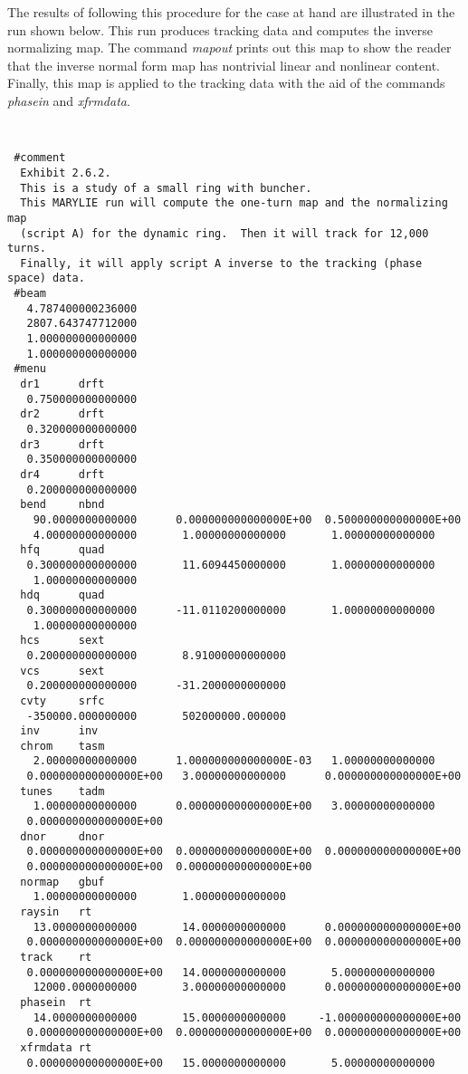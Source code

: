      The results of following this procedure for the case at hand are illustrated
in the \Mary run shown below.  This run produces tracking data and computes the inverse normalizing map.  The command {\em mapout} prints out this map
to show the reader that the inverse normal form map has nontrivial linear
and nonlinear content.  Finally, this map is applied to the tracking data with the aid of the commands {\em phasein} and {\em xfrmdata}.

{
\footnotesize\tt
\begin{verbatim}
 #comment
  Exhibit 2.6.2.
  This is a study of a small ring with buncher.
  This MARYLIE run will compute the one-turn map and the normalizing map
  (script A) for the dynamic ring.  Then it will track for 12,000 turns.
  Finally, it will apply script A inverse to the tracking (phase space) data.
 #beam
   4.787400000236000
   2807.643747712000
   1.000000000000000
   1.000000000000000
 #menu
  dr1      drft
   0.750000000000000
  dr2      drft
   0.320000000000000
  dr3      drft
   0.350000000000000
  dr4      drft
   0.200000000000000
  bend     nbnd
    90.0000000000000      0.000000000000000E+00  0.500000000000000E+00
    4.00000000000000       1.00000000000000       1.00000000000000
  hfq      quad
   0.300000000000000       11.6094450000000       1.00000000000000
    1.00000000000000
  hdq      quad
   0.300000000000000      -11.0110200000000       1.00000000000000
    1.00000000000000
  hcs      sext
   0.200000000000000       8.91000000000000
  vcs      sext
   0.200000000000000      -31.2000000000000
  cvty     srfc
   -350000.000000000       502000000.000000
  inv      inv
  chrom    tasm
    2.00000000000000      1.000000000000000E-03   1.00000000000000
   0.000000000000000E+00   3.00000000000000      0.000000000000000E+00
  tunes    tadm
    1.00000000000000      0.000000000000000E+00   3.00000000000000
   0.000000000000000E+00
  dnor     dnor
   0.000000000000000E+00  0.000000000000000E+00  0.000000000000000E+00
   0.000000000000000E+00  0.000000000000000E+00
  normap   gbuf
    1.00000000000000       1.00000000000000
  raysin   rt
    13.0000000000000       14.0000000000000      0.000000000000000E+00
   0.000000000000000E+00  0.000000000000000E+00  0.000000000000000E+00
  track    rt
   0.000000000000000E+00   14.0000000000000       5.00000000000000
    12000.0000000000       3.00000000000000      0.000000000000000E+00
  phasein  rt
    14.0000000000000       15.0000000000000     -1.000000000000000E+00
   0.000000000000000E+00  0.000000000000000E+00  0.000000000000000E+00
  xfrmdata rt
   0.000000000000000E+00   15.0000000000000       5.00000000000000

\end{verbatim}}
